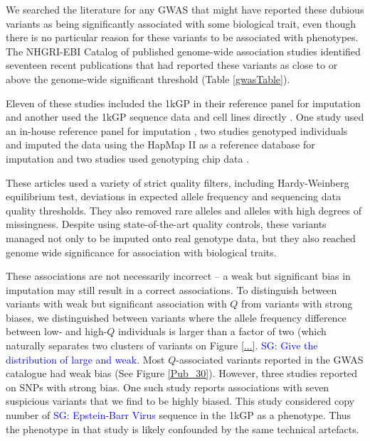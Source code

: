 \documentclass[9pt,lineno]{elife}
\newcommand{\sgcomment}[1]{\textcolor{blue}{SG: #1}}
\begin{document}
We searched the literature for any GWAS that might have reported these dubious variants as being significantly associated with some biological trait, even though there is no particular reason for these variants to be associated with phenotypes.
The NHGRI-EBI Catalog of published genome-wide association studies identified seventeen recent publications that had reported these variants as close to or above the genome-wide significant threshold (Table \ref{gwasTable}).

Eleven of these studies included the 1kGP in their reference panel for imputation \citep{xu2012genome, lutz2015genome, park2015mercapturic, astle2016allelic, herold2016family,  suhre2017connecting, lopez2017genome, tian2017genome,  spracklen2017association,  nagy2017exploration, gao2018genome} and another used the 1kGP sequence data and cell lines directly \citep{Mandage2017}.
One study used an in-house reference panel for imputation \citep{nishida2018key}, two studies genotyped individuals and imputed the data using the HapMap II as a reference  database for imputation \citep{Kraja2011, Ebejer2013} and two studies used genotyping chip data \citep{yucesoy2015genome, ellinghaus2016analysis}.

These articles used a variety of strict quality filters, including Hardy-Weinberg equilibrium test, deviations in expected allele frequency and sequencing data quality thresholds.
They also removed rare alleles and alleles with high degrees of missingness.
Despite using state-of-the-art quality controls, these variants managed not only to be imputed onto real genotype data, but they also reached genome wide significance for association with biological traits.

These associations are not necessarily incorrect -- a weak but significant bias in imputation may still result in a correct associations. 
To distinguish between variants with weak but significant association with $Q$ from variants with strong biases, we distinguished between variants where the allele frequency difference between low- and high-$Q$ individuals is larger than a factor of two (which naturally separates two clusters of variants on Figure \ref{...}. \sgcomment{Give the distribution of large and weak}. Most $Q$-associated variants reported in the GWAS catalogue had weak bias (See Figure \ref{Pub_30}).
However, three studies reported on SNPs with strong bias. One such study reports associations with seven suspicious variants that we find to be highly biased. This study considered copy number of \sgcomment{Epstein-Barr Virus} sequence in the 1kGP as a phenotype. Thus the phenotype in that study is likely confounded by the same technical artefacts.
\end{document}
